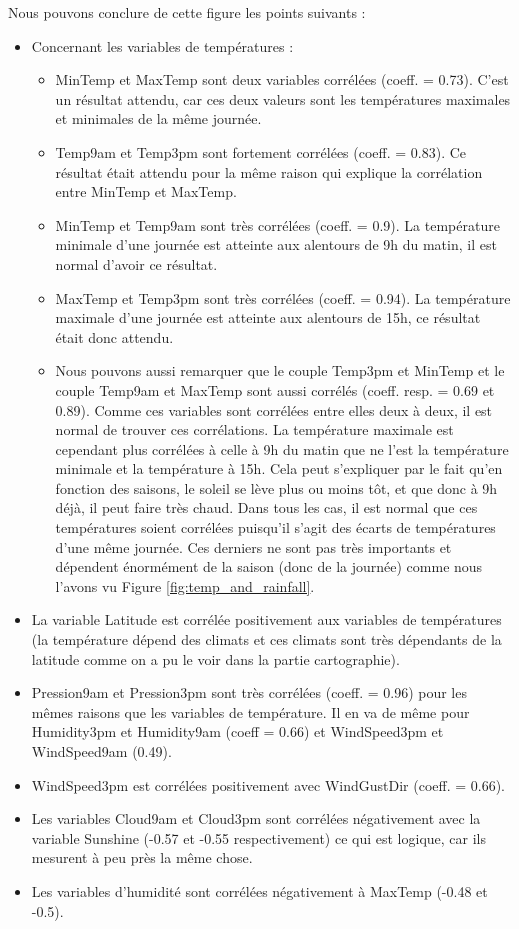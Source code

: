 \documentclass{article}
\begin{document}
Nous pouvons conclure de cette figure les points suivants : 
\begin{itemize}
    \item Concernant les variables de températures : 
    \begin{itemize}
        \item MinTemp et MaxTemp sont deux variables corrélées (coeff. = 0.73). C'est un résultat attendu, car ces deux valeurs sont les températures maximales et minimales de la même journée. 
        \item Temp9am et Temp3pm sont fortement corrélées (coeff. = 0.83). Ce résultat était attendu pour la même raison qui explique la corrélation entre MinTemp et MaxTemp.
        \item MinTemp et Temp9am sont très corrélées (coeff. = 0.9). La température minimale d'une journée est atteinte aux alentours de 9h du matin, il est normal d'avoir ce résultat. 
        \item MaxTemp et Temp3pm sont très corrélées (coeff. = 0.94). La température maximale d'une journée est atteinte aux alentours de 15h, ce résultat était donc attendu. 
        \item Nous pouvons aussi remarquer que le couple Temp3pm et MinTemp et le couple Temp9am et MaxTemp sont aussi corrélés (coeff. resp. = 0.69 et 0.89). Comme ces variables sont corrélées entre elles deux à deux, il est normal de trouver ces corrélations. La température maximale est cependant plus corrélées à celle à 9h du matin que ne l'est la température minimale et la température à 15h. Cela peut s'expliquer par le fait qu'en fonction des saisons, le soleil se lève plus ou moins tôt, et que donc à 9h déjà, il peut faire très chaud. Dans tous les cas, il est normal que ces températures soient corrélées puisqu'il s'agit des écarts de températures d'une même journée. Ces derniers ne sont pas très importants et dépendent énormément de la saison (donc de la journée) comme nous l'avons vu Figure \ref{fig:temp_and_rainfall}. 
    \end{itemize}
    \item La variable Latitude est corrélée positivement aux variables de températures (la température dépend des climats et ces climats sont très dépendants de la latitude comme on a pu le voir dans la partie cartographie).
    \item Pression9am et Pression3pm sont très corrélées (coeff. = 0.96) pour les mêmes raisons que les variables de température. Il en va de même pour Humidity3pm et Humidity9am (coeff = 0.66) et WindSpeed3pm et WindSpeed9am (0.49).
    \item WindSpeed3pm est corrélées positivement avec WindGustDir (coeff. = 0.66).
    \item Les variables Cloud9am et Cloud3pm sont corrélées négativement avec la variable Sunshine (-0.57 et -0.55 respectivement) ce qui est logique, car ils mesurent à peu près la même chose. 
    \item Les variables d'humidité sont corrélées négativement à MaxTemp (-0.48 et -0.5).
\end{itemize}
\end{document}
